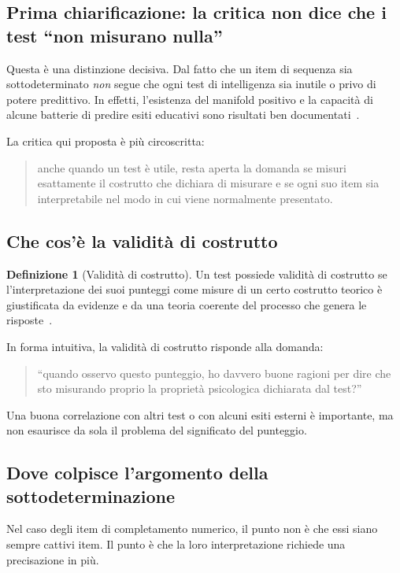 \documentclass[10pt, a4paper]{article}
\theoremstyle{plain}
\theoremstyle{definition}
\newtheorem{definition}{Definizione}
\theoremstyle{remark}
\begin{document}
\subsection{Prima chiarificazione: la critica non dice che i test ``non misurano nulla''}

Questa è una distinzione decisiva. Dal fatto che un item di sequenza sia
sottodeterminato \emph{non} segue che ogni test di intelligenza sia inutile o
privo di potere predittivo. In effetti, l'esistenza del manifold positivo e la
capacità di alcune batterie di predire esiti educativi sono risultati ben
documentati~\cite{deary2007, jensen1998}.

La critica qui proposta è più circoscritta:
\begin{quote}
anche quando un test è utile, resta aperta la domanda se misuri esattamente il
costrutto che dichiara di misurare e se ogni suo item sia interpretabile nel
modo in cui viene normalmente presentato.
\end{quote}

\subsection{Che cos'è la validità di costrutto}

\begin{definition}[Validità di costrutto]
Un test possiede validità di costrutto se l'interpretazione dei suoi punteggi
come misure di un certo costrutto teorico è giustificata da evidenze e da una
teoria coerente del processo che genera le risposte~\cite{cronbach1955,
borsboom2004}.
\end{definition}

In forma intuitiva, la validità di costrutto risponde alla domanda:
\begin{quote}
``quando osservo questo punteggio, ho davvero buone ragioni per dire che sto
misurando proprio la proprietà psicologica dichiarata dal test?''
\end{quote}

Una buona correlazione con altri test o con alcuni esiti esterni è importante,
ma non esaurisce da sola il problema del significato del punteggio.

\subsection{Dove colpisce l'argomento della sottodeterminazione}

Nel caso degli item di completamento numerico, il punto non è che essi siano
sempre cattivi item. Il punto è che la loro interpretazione richiede una
precisazione in più.
\end{document}
